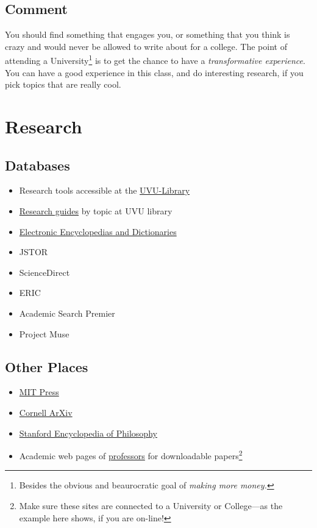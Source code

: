 \documentclass[11pt]{article}
\begin{document}
\subsection{Comment}  
You should find something that engages you, or something that you think is crazy and would never be allowed to write about for a college. The point of attending a University\footnote{Besides the obvious and beaurocratic goal of \emph{making more money.}} is to get the chance to have a \emph{transformative experience}. You can have a good experience in this class, and do interesting research, if you pick topics that are really cool.

\section{Research}
\subsection{Databases}\begin{itemize}  
\item Research tools accessible at the \href{http://www.uvu.edu/library/researchtools/index.html}{UVU-Library}
\item \href{http://www.uvu.edu/library/guides/index.html}{Research guides} by topic at UVU library
\item \href{http://www.uvu.edu/library/researchtools/electronic_encyclopedias.html}{Electronic Encyclopedias and Dictionaries}
\item JSTOR 
\item ScienceDirect 
\item ERIC 
\item Academic Search Premier 
\item Project Muse
\end{itemize}

\subsection{Other Places}
\begin{itemize}
\item \href{http://mitpress.mit.edu}{MIT Press} 
\item \href{http://arxiv.org}{Cornell ArXiv} 
\item \href{http://plato.stanford.edu/}{Stanford Encyclopedia of Philosophy} 
\item Academic web pages of \href{http://www.uvu.edu/profpages/profiles/show/user_id/530}{professors} for downloadable papers\footnote{Make sure these sites are connected to a University or College---as the example here shows, if you are on-line!}
\end{itemize}
\end{document}
